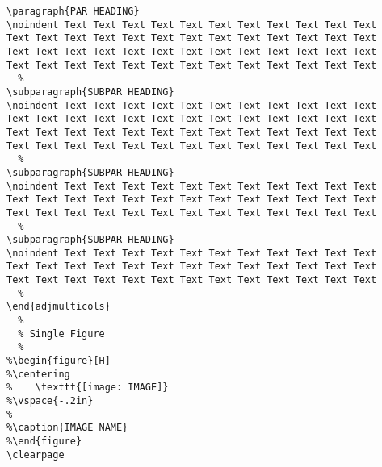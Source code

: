 \begin{verbatim}
\paragraph{PAR HEADING}
\noindent Text Text Text Text Text Text Text Text Text Text Text 
Text Text Text Text Text Text Text Text Text Text Text Text Text
Text Text Text Text Text Text Text Text Text Text Text Text Text
Text Text Text Text Text Text Text Text Text Text Text Text Text
  %
\subparagraph{SUBPAR HEADING}
\noindent Text Text Text Text Text Text Text Text Text Text Text 
Text Text Text Text Text Text Text Text Text Text Text Text Text
Text Text Text Text Text Text Text Text Text Text Text Text Text
Text Text Text Text Text Text Text Text Text Text Text Text Text
  %
\subparagraph{SUBPAR HEADING}
\noindent Text Text Text Text Text Text Text Text Text Text Text 
Text Text Text Text Text Text Text Text Text Text Text Text Text
Text Text Text Text Text Text Text Text Text Text Text Text Text
  %
\subparagraph{SUBPAR HEADING} 
\noindent Text Text Text Text Text Text Text Text Text Text Text 
Text Text Text Text Text Text Text Text Text Text Text Text Text
Text Text Text Text Text Text Text Text Text Text Text Text Text
  %
\end{adjmulticols}
  %
  % Single Figure
  %
%\begin{figure}[H]
%\centering
%    \texttt{[image: IMAGE]}
%\vspace{-.2in}
%
%\caption{IMAGE NAME}
%\end{figure}
\clearpage
\end{verbatim}

